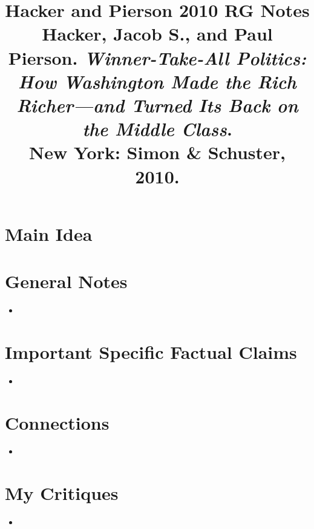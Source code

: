 \documentclass[12pt]{article}
\title{\textbf{Hacker and Pierson 2010 RG Notes}\\
\large Hacker, Jacob S., and Paul Pierson. \textit{Winner-Take-All Politics: How Washington Made the Rich Richer---and Turned Its Back on the Middle Class}.\\
New York: Simon \& Schuster, 2010.}
\author{}
\date{}
\begin{document}
\maketitle

\section{Main Idea}



\section{General Notes}

\begin{itemize}[leftmargin=*, itemsep=4pt]
    \item
\end{itemize}


\section{Important Specific Factual Claims}

\begin{itemize}[leftmargin=*, itemsep=4pt]
    \item
\end{itemize}


\section{Connections}

\begin{itemize}[leftmargin=*, itemsep=4pt]
    \item
\end{itemize}


\section{My Critiques}

\begin{itemize}[leftmargin=*, itemsep=4pt]
    \item
\end{itemize}
\end{document}

